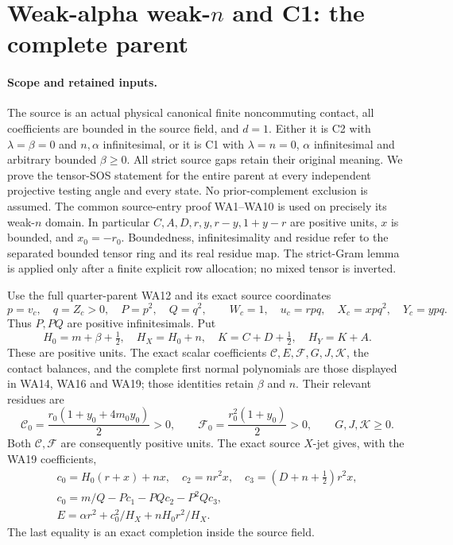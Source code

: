 \section{Weak-alpha weak-\(n\) and C1: the complete parent}
\label{sec:weak-alpha-weak-n-c1}

\paragraph{Scope and retained inputs.}
The source is an actual physical canonical finite noncommuting contact,
all coefficients are bounded in the source field, and \(d=1\).
Either it is C2 with \(\lambda=\beta=0\) and \(n,\alpha\) infinitesimal,
or it is C1 with \(\lambda=n=0\), \(\alpha\) infinitesimal and arbitrary
bounded \(\beta\geq0\). All strict source gaps retain their original
meaning. We prove the tensor-SOS statement for the entire parent at
every independent projective testing angle and every state.
No prior-complement exclusion is assumed.
The common source-entry proof WA1--WA10 is used on precisely its
weak-\(n\) domain. In particular \(C,A,D,r,y,r-y,1+y-r\) are positive
units, \(x\) is bounded, and \(x_0=-r_0\).
Boundedness, infinitesimality and residue refer
to the separated bounded tensor ring and its real residue map.
The strict-Gram lemma is applied only after a finite explicit row
allocation; no mixed tensor is inverted.

Use the full quarter-parent WA12 and its exact source coordinates
\[
 p=v_c,\quad q=Z_c>0,\quad P=p^2,\quad Q=q^2,\qquad
 W_c=1,\quad u_c=rpq,\quad X_c=xpq^2,\quad Y_c=ypq.
 \tag{WN1}
\]
Thus \(P,PQ\) are positive infinitesimals. Put
\[
 H_0=m+\beta+\tfrac12,\quad H_X=H_0+n,\quad
 K=C+D+\tfrac12,\quad H_Y=K+A.
 \tag{WN2}
\]
These are positive units. The exact scalar coefficients
\(\mathcal C,E,\mathcal F,G,J,\mathcal K\), the contact balances, and
the complete first normal polynomials are those displayed in
WA14, WA16 and WA19; those identities retain \(\beta\) and \(n\).
Their relevant residues are
\[
 \mathcal C_0=\frac{r_0(1+y_0+4m_0y_0)}2>0,\qquad
 \mathcal F_0=\frac{r_0^2(1+y_0)}2>0,
 \qquad G,J,\mathcal K\geq0 .
 \tag{WN3}
\]
Both \(\mathcal C,\mathcal F\) are consequently positive units.
The exact source \(X\)-jet gives, with the WA19 coefficients,
\[
\begin{gathered}
 c_0=H_0(r+x)+nx,\quad c_2=nr^2x,\quad
 c_3=(D+n+\tfrac12)r^2x,\\
 c_0=m/Q-Pc_1-PQc_2-P^2Qc_3,\\
 E=\alpha r^2+c_0^2/H_X+nH_0r^2/H_X .
\end{gathered}\tag{WN4}
\]
The last equality is an exact completion inside the source field.

